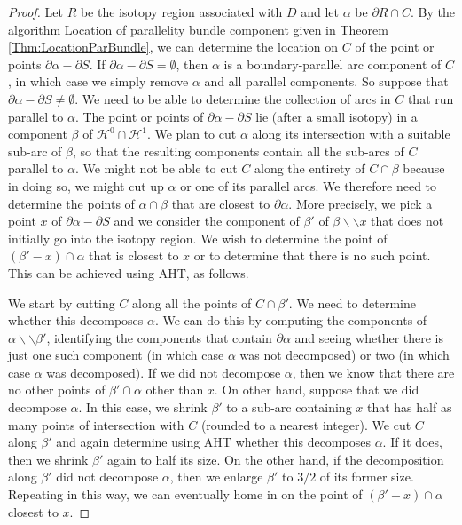 \documentclass[oneside]{amsart}
\numberwithin{equation}{section}
\theoremstyle{plain}
\theoremstyle{definition}
\newcommand{\cut}{\backslash\backslash}
\newcommand{\calH}{\mathcal{H}}
\begin{document}
\begin{proof}
Let $R$ be the isotopy region associated with $D$ and let $\alpha$ be $\partial R \cap C$. By the algorithm {\sc Location of parallelity bundle component}
given in Theorem \ref{Thm:LocationParBundle}, we can determine the location on $C$ of the point or points $\partial \alpha - \partial S$. If $\partial \alpha - \partial S = \emptyset$, then $\alpha$ is a boundary-parallel arc component of $C$, in which case we simply remove $\alpha$ and all parallel components. So suppose that
$\partial \alpha - \partial S \not= \emptyset$.
We need to be able to determine the collection of arcs in $C$ that run parallel to $\alpha$. The point or points of $\partial \alpha - \partial S$ lie (after a small isotopy) in a component $\beta$ of $\calH^0 \cap \calH^1$. We plan to cut $\alpha$ along its intersection with a suitable sub-arc of $\beta$, so that the resulting components contain all the sub-arcs of $C$ parallel to $\alpha$. We might not be able to cut $C$ along the entirety of $C \cap \beta$ because in doing so, we might cut up $\alpha$ or one of its parallel arcs. We therefore need to determine the points of $\alpha \cap \beta$ that are closest to $\partial \alpha$. More precisely, we pick a point $x$ of $\partial \alpha - \partial S$ and we consider the component of $\beta'$ of $\beta \cut x$ that does not initially go into the isotopy region. We wish to determine the point of $(\beta' - x) \cap \alpha$ that is closest to $x$ or to determine that there is no such point. This can be achieved using AHT, as follows.

We start by cutting $C$ along all the points of $C \cap \beta'$. We need to determine whether this decomposes $\alpha$. We can do this by computing the components of $\alpha \cut \beta'$, identifying the components that contain $\partial \alpha$ and seeing whether there is just one such component (in which case $\alpha$ was not decomposed) or two (in which case $\alpha$ was decomposed). 
If we did not decompose $\alpha$, then we know that there are no other points of $\beta' \cap \alpha$ other than $x$. On other hand, suppose that we did decompose $\alpha$. In this case, we shrink $\beta'$ to a sub-arc containing $x$ that has half as many points of intersection with $C$ (rounded to a nearest integer). We cut $C$ along $\beta'$ and again determine using AHT whether this decomposes $\alpha$. If it does, then we shrink $\beta'$ again to half its size. On the other hand, if the decomposition along $\beta'$ did not decompose $\alpha$, then we enlarge $\beta'$ to $3/2$ of its former size. Repeating in this way, we can eventually home in on the point of $(\beta' - x) \cap \alpha$ closest to $x$.


\end{proof}
\end{document}
